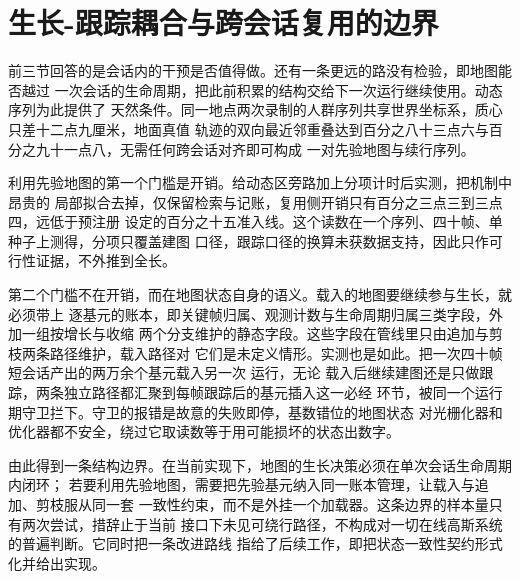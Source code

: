 \section{生长-跟踪耦合与跨会话复用的边界}
\label{sec:study3-coupling}

前三节回答的是会话内的干预是否值得做。还有一条更远的路没有检验，即地图能否越过
一次会话的生命周期，把此前积累的结构交给下一次运行继续使用。动态序列为此提供了
天然条件。同一地点两次录制的人群序列共享世界坐标系，质心只差十二点九厘米，地面真值
轨迹的双向最近邻重叠达到百分之八十三点六与百分之九十一点八，无需任何跨会话对齐即可构成
一对先验地图与续行序列。

利用先验地图的第一个门槛是开销。给动态区旁路加上分项计时后实测，把机制中昂贵的
局部拟合去掉，仅保留检索与记账，复用侧开销只有百分之三点三到三点四，远低于预注册
设定的百分之十五准入线。这个读数在一个序列、四十帧、单种子上测得，分项只覆盖建图
口径，跟踪口径的换算未获数据支持，因此只作可行性证据，不外推到全长。

第二个门槛不在开销，而在地图状态自身的语义。载入的地图要继续参与生长，就必须带上
逐基元的账本，即关键帧归属、观测计数与生命周期归属三类字段，外加一组按增长与收缩
两个分支维护的静态字段。这些字段在管线里只由追加与剪枝两条路径维护，载入路径对
它们是未定义情形。实测也是如此。把一次四十帧短会话产出的两万余个基元载入另一次
运行，无论
载入后继续建图还是只做跟踪，两条独立路径都汇聚到每帧跟踪后的基元插入这一必经
环节，被同一个运行期守卫拦下。守卫的报错是故意的失败即停，基数错位的地图状态
对光栅化器和优化器都不安全，绕过它取读数等于用可能损坏的状态出数字。

由此得到一条结构边界。在当前实现下，地图的生长决策必须在单次会话生命周期内闭环；
若要利用先验地图，需要把先验基元纳入同一账本管理，让载入与追加、剪枝服从同一套
一致性约束，而不是外挂一个加载器。这条边界的样本量只有两次尝试，措辞止于当前
接口下未见可绕行路径，不构成对一切在线高斯系统的普遍判断。它同时把一条改进路线
指给了后续工作，即把状态一致性契约形式化并给出实现。

